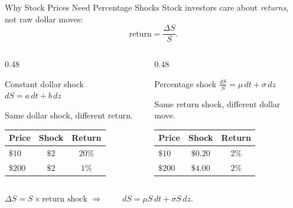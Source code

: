 \documentclass[aspectratio=169,11pt]{beamer}
\begin{document}
\begin{frame}{Why Stock Prices Need Percentage Shocks}
    \footnotesize
    Stock investors care about \emph{returns}, not raw dollar moves:
    \[
        \text{return}=\frac{\Delta S}{S}.
    \]

    \begin{columns}[T]
        \begin{column}{0.48\textwidth}
            \begin{alertblock}{Constant dollar shock}
                \centering
                \(dS=a\,dt+b\,dz\)

                \vspace{0.25em}
                Same dollar shock, different return.

                \vspace{0.25em}
                \begin{tabular}{lcc}
                    \toprule
                    Price & Shock & Return \\
                    \midrule
                    \(\$10\)  & \(\$2\) & \(20\%\) \\
                    \(\$200\) & \(\$2\) & \(1\%\) \\
                    \bottomrule
                \end{tabular}
            \end{alertblock}
        \end{column}
        \begin{column}{0.48\textwidth}
            \begin{block}{Percentage shock}
                \centering
                \(\frac{dS}{S}=\mu\,dt+\sigma\,dz\)

                \vspace{0.25em}
                Same return shock, different dollar move.

                \vspace{0.25em}
                \begin{tabular}{lcc}
                    \toprule
                    Price & Shock & Return \\
                    \midrule
                    \(\$10\)  & \(\$0.20\) & \(2\%\) \\
                    \(\$200\) & \(\$4.00\) & \(2\%\) \\
                    \bottomrule
                \end{tabular}
            \end{block}
        \end{column}
    \end{columns}

    \vspace{0.35em}
    \begin{center}
        \(\Delta S = S\times \text{return shock}\)
        \qquad \(\Longrightarrow\qquad\)
        \(dS=\mu S\,dt+\sigma S\,dz\).
    \end{center}
\end{frame}
\end{document}

